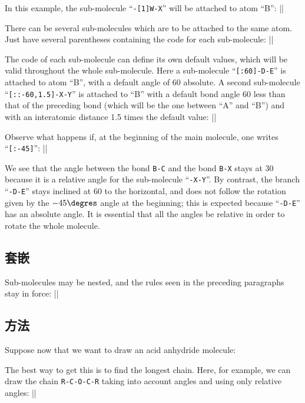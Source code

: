 \documentclass[10pt]{article}
\begin{document}
In this example, the sub-molecule ``\verb/-[1]W-X/'' will be attached to atom ``B'': 
||

There can be several sub-molecules which are to be attached to the same atom. Just have several parentheses containing the code for each sub-molecule:
||

The code of each sub-molecule can define its own default values, which will be valid throughout the whole sub-molecule. Here a sub-molecule ``\verb/[:60]-D-E/'' is attached to atom ``B'', with a default angle of 60\degres{} absolute. A second sub-molecule ``\verb/[::-60,1.5]-X-Y/'' is attached to ``B'' with a default bond angle 60\degres{} less than that of the preceding bond (which will be the one between ``A'' and ``B'') and with an interatomic distance 1.5 times the default value:
||

Observe what happens if, at the beginning of the main molecule, one writes ``\verb/[:-45]/'':
||

We see that the angle between the bond \verb/B-C/ and the bond \verb/B-X/ stays at 30\degres{} because it is a relative angle for the sub-molecule ``\verb/-X-Y/''. By contrast, the branch ``\verb/-D-E/'' stays inclined at 60\degres{} to the horizontal, and does not follow the rotation given by the $-45\degres$ angle at the beginning; this is expected because ``\verb/-D-E/'' has an absolute angle. It is essential that all the angles be relative in order to rotate the whole molecule.

\subsection{套嵌}
Sub-molecules may be nested, and the rules seen in the preceding paragraphs stay in force:
||

\subsection{方法}
Suppose now that we want to draw an acid anhydride molecule:

The best way to get this is to find the longest chain. Here, for example, we can draw the chain \verb/R-C-O-C-R/ taking into account angles and using only relative angles:
||
\end{document}
